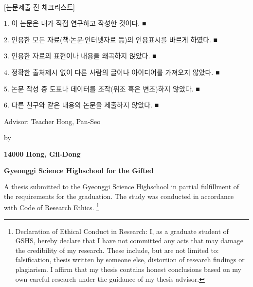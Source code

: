 \documentclass[11pt]{article}
\begin{document}
	\newpage
	
	\begin{center}
		\vspace*{30mm}
		\huge{\ttitleko}
		\\
		\vspace{10mm}
		\LARGE{\ttitle}
	\end{center}
	
	\vspace{30mm}
	\begin{center}
		[논문제출 전 체크리스트]
	\end{center}
	
	\small
	1. 이 논문은 내가 직접 연구하고 작성한 것이다. ■
	
	2. 인용한 모든 자료(책∙논문∙인터넷자료 등)의 인용표시를 바르게 하였다. ■
	
	3. 인용한 자료의 표현이나 내용을 왜곡하지 않았다. ■
	
	4. 정확한 출처제시 없이 다른 사람의 글이나 아이디어를 가져오지 않았다. ■
	
	5. 논문 작성 중 도표나 데이터를 조작(위조 혹은 변조)하지 않았다. ■
	
	6. 다른 친구와 같은 내용의 논문을 제출하지 않았다. ■
	\normalsize
	
	\newpage
	
	\begin{center}
		\LARGE{\ttitle}
		\vspace{20mm}
		
		\Large
		Advisor: Teacher Hong, Pan-Seo
		
		by
		\vspace{5mm}
		
		\textbf{14000 Hong, Gil-Dong}
		
		\textbf{Gyeonggi Science Highschool for the Gifted}
	\end{center}
	
	\vspace{10mm}
	A thesis submitted to the Gyeonggi Science Highschool in partial fulfillment of the requirements for the graduation. The study was conducted in accordance with Code of Research Ethics.
	\footnote{Declaration of Ethical Conduct in Research: I, as a graduate student of GSHS, hereby declare that I have not committed any acts that may damage the credibility of my research. These include, but are not limited to: falsification, thesis written by someone else, distortion of research findings or plagiarism. I affirm that my thesis contains honest conclusions based on my own careful research under the guidance of my thesis advisor.}
	
\end{document}
